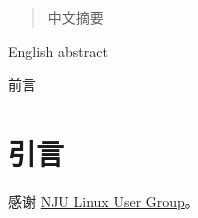 \documentclass[
    ]{njuthesis}
\begin{document}

\maketitle


\begin{abstract}
    中文摘要
\end{abstract}

\begin{abstract*}
    English abstract
\end{abstract*}

\begin{preface}
    前言
\end{preface}

\tableofcontents
\listoffigures
\listoftables

\mainmatter

%   
%   

\chapter{引言}


\printbibliography


\begin{acknowledgement}
    感谢 \href{https://git.nju.edu.cn/nju-lug/lug-introduction}{NJU Linux User Group}。
\end{acknowledgement}
    

\appendix


\end{document}
